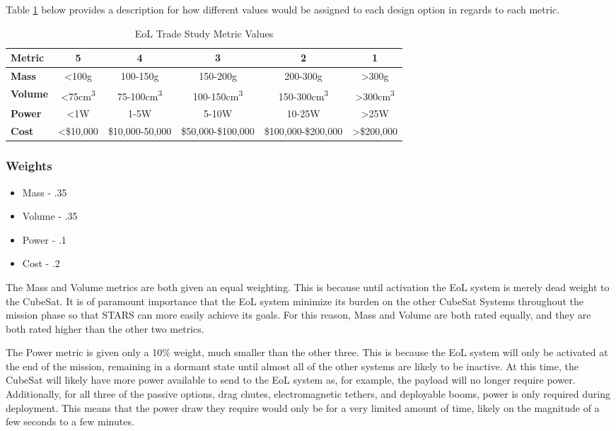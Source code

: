 \documentclass{ece}
\begin{document}
Table \ref{tbl:EoL_Metric_Scores} below provides a description for how different values would be assigned to each design option in regards to each metric. 

\begin{table}[H]
\centering
\begin{tabular}{|l|c|c|c|c|c|} 
\hline
    \textbf{Metric} & \textbf{5} & \textbf{4} & \textbf{3} & \textbf{2} & \textbf{1}
    \\
\hline
    \textbf{Mass} & <100g & 100-150g & 150-200g & 200-300g & >300g 
    \\
\hline
    \textbf{Volume} & <75cm\textsuperscript{3} & 75-100cm\textsuperscript{3} & 100-150cm\textsuperscript{3} & 150-300cm\textsuperscript{3} & >300cm\textsuperscript{3} 
    \\
\hline
    \textbf{Power} & <1W & 1-5W & 5-10W & 10-25W & >25W 
    \\
\hline
    \textbf{Cost} & <\$10,000 & \$10,000-50,000 & \$50,000-\$100,000 & \$100,000-\$200,000 & >\$200,000 
    \\

\hline
\end{tabular}
\caption{EoL Trade Study Metric Values}
\label{tbl:EoL_Metric_Scores}
\end{table}
\subsubsection{Weights}
\begin{itemize}
    \item Mass - .35
    \item Volume - .35
    \item Power - .1
    \item Cost - .2
\end{itemize}

The Mass and Volume metrics are both given an equal weighting. This is because until activation the EoL system is merely dead weight to the CubeSat. It is of paramount importance that the EoL system minimize its burden on the other CubeSat Systems throughout the mission phase so that STARS can more easily achieve its goals. For this reason, Mass and Volume are both rated equally, and they are both rated higher than the other two metrics. 

The Power metric is given only a 10\% weight, much smaller than the other three. This is because the EoL system will only be activated at the end of the mission, remaining in a dormant state until almost all of the other systems are likely to be inactive. At this time, the CubeSat will likely have more power available to send to the EoL system as, for example, the payload will no longer require power. Additionally, for all three of the passive options, drag chutes, electromagnetic tethers, and deployable booms, power is only required during deployment. This means that the power draw they require would only be for a very limited amount of time, likely on the magnitude of a few seconds to a few minutes. 
\end{document}
